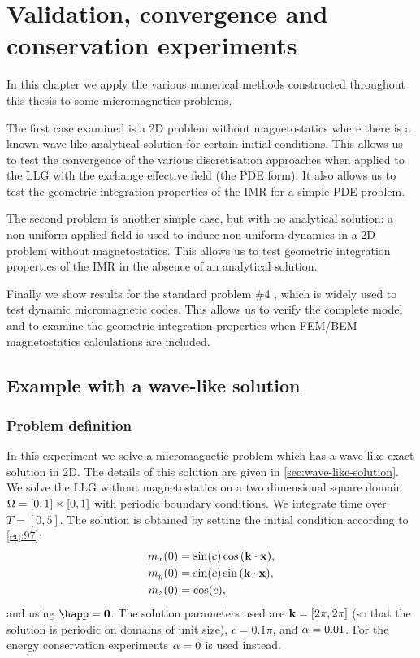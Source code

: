 \chapter{Validation, convergence and conservation experiments}
\label{cha:numer-experiments}

In this chapter we apply the various numerical methods constructed throughout this thesis to some micromagnetics problems.

The first case examined is a 2D problem without magnetostatics where there is a known wave-like analytical solution for certain initial conditions.
This allows us to test the convergence of the various discretisation approaches when applied to the LLG with the exchange effective field (\ie the PDE form).
It also allows us to test the geometric integration properties of the IMR for a simple PDE problem.

The second problem is another simple case, but with no analytical solution: a non-uniform applied field is used to induce non-uniform dynamics in a 2D problem without magnetostatics.
This allows us to test geometric integration properties of the IMR in the absence of an analytical solution.

Finally we show results for the \mumag standard problem \#4 \cite{mumag-website}, which is widely used to test dynamic micromagnetic codes.
This allows us to verify the complete model and to examine the geometric integration properties when FEM/BEM magnetostatics calculations are included.


\section{Example with a wave-like solution}
\label{sec:numer-exper}

\subsection{Problem definition}
\label{sec:wave-problem-definition}

In this experiment we solve a micromagnetic problem which has a wave-like exact solution in 2D.
The details of this solution are given in \cref{sec:wave-like-solution}.
We solve the LLG without magnetostatics on a two dimensional square domain $\Omega = [0,1] \times [0,1]$ with periodic boundary conditions.
We integrate time over $T = [0, 5]$.
The solution is obtained by setting the initial condition according to \cref{eq:97}:
\begin{equation}
  \begin{aligned}
    m_x(0) &= \sin(c) \cos{\left( \boldsymbol{\mathrm{k}}\cdot \boldsymbol{\mathrm{x}}\right)}, \\
    m_y(0) &= \sin(c) \sin{\left( \boldsymbol{\mathrm{k}}\cdot \boldsymbol{\mathrm{x}}\right)}, \\
    m_z(0) &= \cos(c),
  \end{aligned}
\end{equation}
and using $\happ = \zerov$.
The solution parameters used are $\boldsymbol{\mathrm{k}} = [2\pi, 2\pi]$ (so that the solution is periodic on domains of unit size), $c = 0.1\pi$, and $\alpha = 0.01$.
For the energy conservation experiments $\alpha = 0$ is used instead.

